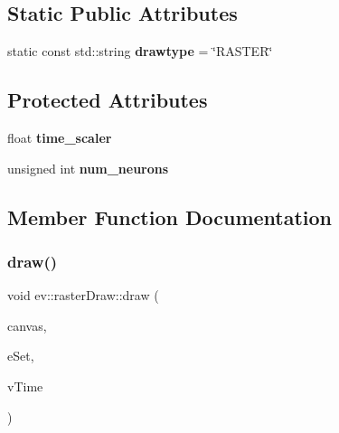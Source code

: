\subsection*{Static Public Attributes}
\begin{DoxyCompactItemize}
\item 
\mbox{\label{classev_1_1rasterDraw_a06c45585c1be282ee35e4905a9c8e9e9}} 
static const std\+::string {\bfseries drawtype} = \char`\"{}R\+A\+S\+T\+ER\char`\"{}
\end{DoxyCompactItemize}
\subsection*{Protected Attributes}
\begin{DoxyCompactItemize}
\item 
\mbox{\label{classev_1_1rasterDraw_a5514c37ed65ebed9c8214be62e7d57ad}} 
float {\bfseries time\+\_\+scaler}
\item 
\mbox{\label{classev_1_1rasterDraw_a87ff52dc9731f95dad3873573fcd8681}} 
unsigned int {\bfseries num\+\_\+neurons}
\end{DoxyCompactItemize}


\subsection{Member Function Documentation}
\mbox{\label{classev_1_1rasterDraw_a0cc698fe53b645a8a1ed8cdb40c8b7a9}} 
\subsubsection{\texorpdfstring{draw()}{draw()}}
{\footnotesize\ttfamily void ev\+::raster\+Draw\+::draw (\begin{DoxyParamCaption}\item[{cv\+::\+Mat \&}]{canvas,  }\item[{const ev\+::v\+Queue \&}]{e\+Set,  }\item[{int}]{v\+Time }\end{DoxyParamCaption})\hspace{0.3cm}{\ttfamily [virtual]}}



